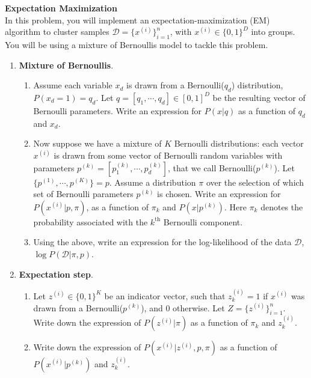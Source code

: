 \begin{Q}
\textbf{\Large  Expectation Maximization}\\
In this problem, you will implement an expectation-maximization (EM) algorithm to cluster samples $\mathcal{D}=\{x^{(i)}\}_{i=1}^{n}$, with $x^{(i)} \in \{ 0,1 \}^{D}$ into groups. You will be using a mixture of Bernoullis model to tackle this problem. 


\begin{enumerate}

\item \textbf{Mixture of Bernoullis}. 

\begin{enumerate}
\item Assume each variable $x_d$ is drawn from a Bernoulli($q_{d}$) distribution, $P(x_{d}=1)=q_{d}$. Let $q=[q_{1}, \cdots, q_{d}] \in [0,1]^{D}$ be the resulting vector of Bernoulli parameters. Write an expression for $P(x|q)$ as a function of $q_d$ and $x_{d}$.

\item Now suppose we have a mixture of $K$ Bernoulli distributions: each vector $x^{(i)}$ is drawn from some vector of Bernoulli random variables with parameters $p^{(k)}=[p_{1}^{(k)}, \cdots, p_{d}^{(k)}]$, that we call Bernoulli($p^{(k)}$). Let $\{p^{(1)}, \cdots , p^{(K)}\} =p$.  Assume a distribution $\pi$ over the selection of which set of Bernoulli parameters $p^{(k)}$ is chosen. Write an expression for $P(x^{(i)}|p, \pi)$, as a function of $\pi_{k}$ and $P(x|p^{(k)})$. Here $\pi_{k}$ denotes the probability associated with the $k^{\text{th}}$ Bernoulli component.

\item Using the above, write an expression for the log-likelihood of the data $\mathcal{D}$, $\log P(\mathcal{D}|\pi, p)$.

\end{enumerate}

\item  \textbf{Expectation step}. 

\begin{enumerate}
\item Let $z^{(i)}\in \{ 0,1\}^{K}$ be an indicator vector, such that $z_{k}^{(i)}=1$ if $x^{(i)}$ was drawn from a Bernoulli($p^{(k)}$), and 0 otherwise. Let $Z= \{ z^{(i)}\}_{i=1}^{n}$.  
Write down the expression of $P(z^{(i)}|\pi)$ as a function of $\pi_{k}$ and ${z_{k}^{(i)}}$. 

\item Write down the expression of $P(x^{(i)}| z^{(i)}, p, \pi  )$ as a function of $P(x^{(i)}|p^{(k)})$ and $z_{k}^{(i)}$.


\end{enumerate}
\end{enumerate}
\end{Q}
